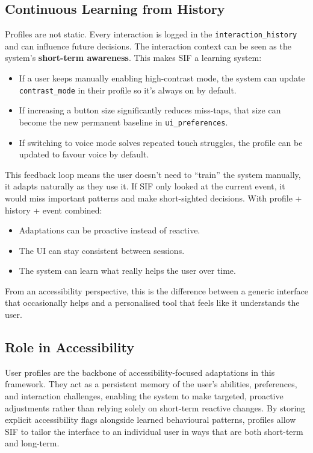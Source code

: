 \documentclass[openany]{book}
\begin{document}
\subsection{Continuous Learning from History}
Profiles are not static. Every interaction is logged in the \texttt{interaction\_history} and can influence future decisions. The interaction context can be seen as the system's \textbf{short-term awareness}.
This makes SIF a learning system:
\begin{itemize}
    \item If a user keeps manually enabling high-contrast mode, the system can update \texttt{contrast\_mode} in their profile so it’s always on by default.
    \item If increasing a button size significantly reduces miss-taps, that size can become the new permanent baseline in \texttt{ui\_preferences}.
    \item If switching to voice mode solves repeated touch struggles, the profile can be updated to favour voice by default.
\end{itemize}
This feedback loop means the user doesn’t need to “train” the system manually, it adapts naturally as they use it. If SIF only looked at the current event, it would miss important patterns and make short-sighted decisions.
With profile + history + event combined:
\begin{itemize}
    \item Adaptations can be proactive instead of reactive.
    \item The UI can stay consistent between sessions.
    \item The system can learn what really helps the user over time.
\end{itemize}
From an accessibility perspective, this is the difference between a generic interface that occasionally helps and a personalised tool that feels like it understands the user.

\subsection{Role in Accessibility}
User profiles are the backbone of accessibility-focused adaptations in this framework. They act as a persistent memory of the user’s abilities, preferences, and interaction challenges, enabling the system to make targeted, proactive adjustments rather than relying solely on short-term reactive changes. By storing explicit accessibility flags alongside learned behavioural patterns, profiles allow SIF to tailor the interface to an individual user in ways that are both short-term and long-term.
\end{document}
